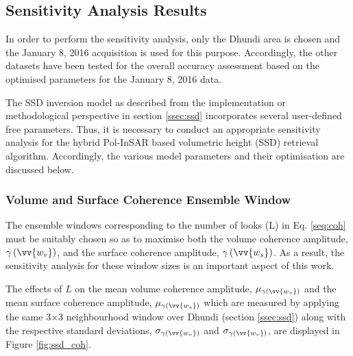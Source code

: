 \documentclass[12pt]{elsarticle}
\numberwithin{equation}{section}
\numberwithin{figure}{section}
\numberwithin{table}{section}
\begin{document}
\subsection{Sensitivity Analysis Results}
\label{ssec:sar}
In order to perform the sensitivity analysis, only the Dhundi area is chosen and the January 8, 2016 acquisition is used for this purpose. Accordingly, the other datasets have been tested for the overall accuracy assessment based on the optimised parameters for the January 8, 2016 data.

The SSD inversion model as described from the implementation or methodological perspective in section \ref{ssec:ssd} incorporates several user-defined free parameters. Thus, it is necessary to conduct an appropriate sensitivity analysis for the hybrid Pol-InSAR based volumetric height (SSD) retrieval algorithm. Accordingly, the various model parameters and their optimisation are discussed below.

\subsubsection{Volume and Surface Coherence Ensemble Window}

The ensemble windows corresponding to the number of looks (L) in Eq. \eqref{seq:coh} must be suitably chosen so as to maximise both the volume coherence amplitude, $\gamma\left(\vv{w_v}\right)$, and the surface coherence amplitude, $\gamma\left(\vv{w_s}\right)$. As a result, the sensitivity analysis for these window sizes is an important aspect of this work.

The effects of $L$ on the mean volume coherence amplitude, $\mu_{\gamma\left(\vv{w_v}\right)}$ and the mean surface coherence amplitude, $\mu_{\gamma\left(\vv{w_s}\right)}$ which are measured by applying the same 3$\times$3 neighbourhood window over Dhundi (section \ref{ssec:ssd}) along with the respective standard deviations, $\sigma_{\gamma\left(\vv{w_v}\right)}$ and $\sigma_{\gamma\left(\vv{w_v}\right)}$, are displayed in Figure \ref{fig:ssd_coh}. 
\end{document}
